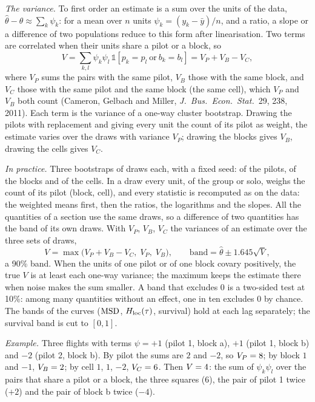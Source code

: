 \emph{The variance.} To first order an estimate is a sum over the units of the data, $\hat\theta-\theta\approx\sum_k\psi_k$: for a mean over $n$ units $\psi_k=(y_k-\bar y)/n$, and a ratio, a slope or a difference of two populations reduce to this form after linearisation.
Two terms are correlated when their units share a pilot or a block, so
\[
  V=\sum_{k,l}\psi_k\psi_l\,\mathbb 1[p_k=p_l\ \text{or}\ b_k=b_l]=V_P+V_B-V_C ,
\]
where $V_P$ sums the pairs with the same pilot, $V_B$ those with the same block, and $V_C$ those with the same pilot and the same block (the same cell), which $V_P$ and $V_B$ both count (Cameron, Gelbach and Miller, \emph{J.\ Bus.\ Econ.\ Stat.}\ 29, 238, 2011).
Each term is the variance of a one-way cluster bootstrap. Drawing the pilots with replacement and giving every unit the count of its pilot as weight, the estimate varies over the draws with variance $V_P$; drawing the blocks gives $V_B$, drawing the cells gives $V_C$.

\emph{In practice.} Three bootstraps of \NBoot{} draws each, with a fixed seed: of the pilots, of the blocks and of the cells. In a draw every unit, of the group or solo, weighs the count of its pilot (block, cell), and every statistic is recomputed as on the data: the weighted means first, then the ratios, the logarithms and the slopes.
All the quantities of a section use the same draws, so a difference of two quantities has the band of its own draws. With $V_P$, $V_B$, $V_C$ the variances of an estimate over the three sets of draws,
\[
  V=\max\bigl(V_P+V_B-V_C,\;V_P,\;V_B\bigr),\qquad\text{band}=\hat\theta\pm1.645\sqrt V,
\]
a 90\% band. When the units of one pilot or of one block covary positively, the true $V$ is at least each one-way variance; the maximum keeps the estimate there when noise makes the sum smaller. A band that excludes 0 is a two-sided test at 10\%: among many quantities without an effect, one in ten excludes 0 by chance.
The bands of the curves ($\mathrm{MSD}$, $H_\mathrm{loc}(\tau)$, survival) hold at each lag separately; the survival band is cut to $[0,1]$.

\emph{Example.} Three flights with terms $\psi=+1$ (pilot 1, block a), $+1$ (pilot 1, block b) and $-2$ (pilot 2, block b). By pilot the sums are $2$ and $-2$, so $V_P=8$; by block $1$ and $-1$, $V_B=2$; by cell $1$, $1$, $-2$, $V_C=6$. Then $V=4$:
the sum of $\psi_k\psi_l$ over the pairs that share a pilot or a block, the three squares (6), the pair of pilot 1 twice ($+2$) and the pair of block b twice ($-4$).

